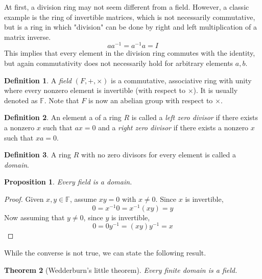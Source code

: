 \documentclass{article}
\newtheorem{theorem}{Theorem}[section]
\newtheorem{proposition}[theorem]{Proposition}
\theoremstyle{remark}
\theoremstyle{definition}
\newtheorem{definition}{Definition}[section]
\begin{document}
At first, a division ring may not seem different from a field. However, a classic example is the ring of invertible matrices, which is not necessarily commutative, but is a ring in which "division" can be done by right and left multiplication of a matrix inverse. 
\[ a a^{-1} = a^{-1} a = I \]
This implies that every element in the division ring commutes with the identity, but again commutativity does not necessarily hold for arbitrary elements $a, b$. 

\begin{definition}
A \textit{field} $(F, +, \times)$ is a commutative, associative ring with unity where every nonzero element is invertible (with respect to $\times$). It is usually denoted as $\mathbb{F}$. Note that $F$ is now an abelian group with respect to $\times$. 
\end{definition}

\begin{definition}
An element a of a ring $R$ is called a \textit{left zero divisor} if there exists a nonzero $x$ such that $a x = 0$ and a \textit{right zero divisor} if there exists a nonzero $x$ such that $x a = 0$. 
\end{definition}

\begin{definition}
A ring $R$ with no zero divisors for every element is called a \textit{domain}. 
\end{definition}

\begin{proposition}
Every field is a domain. 
\end{proposition}
\begin{proof}
Given $x, y \in \mathbb{F}$, assume $x y = 0$ with $x \neq 0$. Since $x$ is invertible,
\[ 0 = x^{-1} 0 = x^{-1} (x y) = y\]
Now assuming that $y \neq 0$, since $y$ is invertible, 
\[ 0 = 0 y^{-1} = (x y) y^{-1} = x \]
\end{proof}

While the converse is not true, we can state the following result. 

\begin{theorem}[Wedderburn's little theorem]
Every finite domain is a field. 
\end{theorem}
\end{document}
